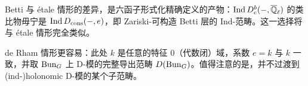 Betti 与 étale 情形的差异，是六函子形式化精确定义的产物：$\operatorname{Ind} D^b_c(-,\overline{\mathbb{Q}}_{\ell})$ 的类比物毋宁是 $\operatorname{Ind} D_{\mathrm{cons}}(-,e)$，即 Zariski-可构造 Betti 层的 Ind-范畴。这一选择将与 étale 情形完全类似。

de Rham 情形更容易：此处 $k$ 是任意的特征 $0$（代数闭）域，系数 $e=k$ 与 $k$ 一致，并取 $\operatorname{Bun}_G$ 上 D-模的完整导出范畴 $D(\operatorname{Bun}_G)$。值得注意的是，并不过渡到 (ind-)holonomic D-模的某个子范畴。
